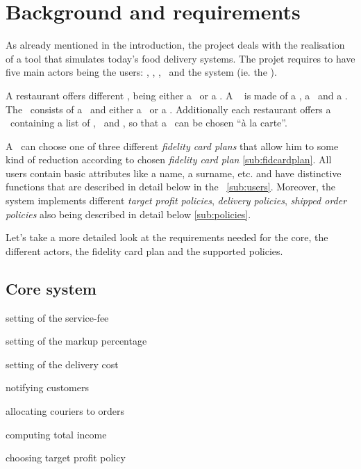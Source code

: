 \section{Background and requirements} %
\label{sec:background}

As already mentioned in the introduction, the project deals with the realisation of
a tool that simulates today's food delivery systems. The projet requires to have five main 
actors being the users: \Restaurant, \Customer, \Manager, \Courier~and the system (ie. the \Core).

A restaurant offers different \Meal, being either a \HalfMeal~or a  
\FullMeal. A \FullMeal~ is made of a \Starter, a \MainDish~and a \Dessert.
The \HalfMeal~consists of a \MainDish~and either a \Starter~or a \Dessert. 
Additionally each restaurant offers a \Menu~containing 
a list of \Starter, \MainDish~and \Dessert, so that a \Meal~can be chosen ``à la carte''. 

A \Customer~can choose one of three different \emph{fidelity card plans}
that allow him to some kind of reduction 
according to chosen \emph{fidelity card plan} \ref{sub:fidcardplan}.
All users contain basic attributes like a name, a surname, etc.
and have distinctive functions that are described 
in detail below in the ~\ref{sub:users}.
Moreover, the system implements different \emph{target profit policies},
\emph{delivery policies}, \emph{shipped order policies}
also being described in detail below \ref{sub:policies}.

Let's take a more detailed look at the requirements
needed for the core, the different actors,
the fidelity card plan and the supported policies.

\subsection{Core system} %
\label{sub:core_system}
\vspace{0.3\baselineskip}

\begin{itemize}
  \begin{minipage}{0.51\linewidth}
    \item setting of the service-fee
    \item setting of the markup percentage
    \item setting of the delivery cost
    \item notifying customers
  \end{minipage}
  \begin{minipage}{0.57\linewidth}
   \item allocating couriers to orders
   \item computing total income 
   \item choosing target profit policy
  \end{minipage}
\end{itemize}

